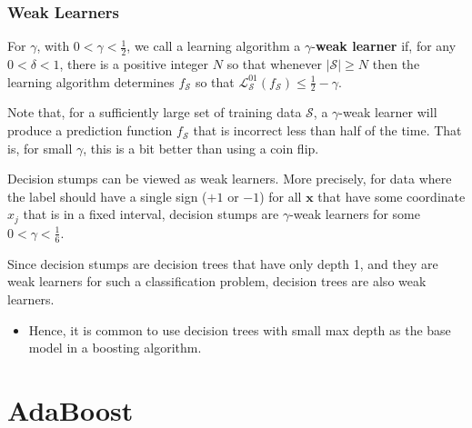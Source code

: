 \documentclass[smaller]{beamer}
\theoremstyle{example}
\newcommand{\x}{\textbf{x}}
\begin{document}
\begin{frame}
    \frametitle{Weak Learners}
    For $\gamma$, with $0 < \gamma < \frac12$, we call a learning algorithm a $\gamma$-\textbf{weak learner} if, for any $0 < \delta < 1$, there is a positive integer $N$ so that whenever $|\mathcal S| \ge N$ then the learning algorithm determines $f_{\mathcal S}$ so that $\mathcal L_{\mathcal S}^{01}(f_{\mathcal S}) \le \frac{1}{2} - \gamma$.

    \vspace{12pt}
    Note that, for a sufficiently large set of training data $\mathcal S$, a $\gamma$-weak learner will produce a prediction function $f_{\mathcal S}$ that is incorrect less than half of the time. That is, for small $\gamma$, this is a bit better than using a coin flip.

    Decision stumps can be viewed as weak learners. More precisely, for data where the label should have a single sign ($+1$ or $-1$) for all $\x$ that have some coordinate $x_j$ that is in a fixed interval, decision stumps are $\gamma$-weak learners for some $0 < \gamma < \frac16$.

    Since decision stumps are decision trees that have only depth 1, and they are weak learners for such a classification problem, decision trees are also weak learners. 
    \begin{itemize}
        \item Hence, it is common to use decision trees with small max depth as the base model in a boosting algorithm.
    \end{itemize}
\end{frame}

\section{AdaBoost}
\end{document}
